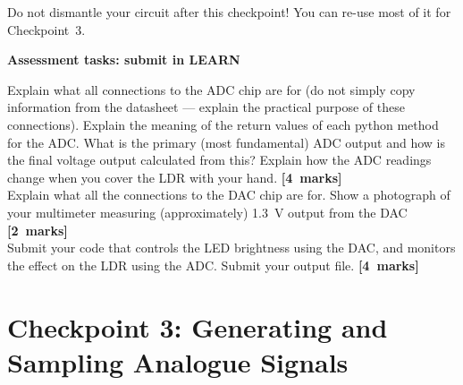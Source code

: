 Do not dismantle your circuit after this checkpoint!
You can re-use most of it for Checkpoint~3.

{\bf Assessment tasks: submit in LEARN}

Explain what all connections to the ADC chip are for (do not simply copy information from the datasheet --- explain the practical purpose of these connections).
Explain the meaning of the return values of each python method for the ADC.
What is the primary (most fundamental) ADC output and how is the final voltage output calculated from this?
Explain how the ADC readings change when you cover the LDR with your hand.
\hfill {\bf[4~marks]} \\

Explain what all the connections to the DAC chip are for.
Show a photograph of your multimeter measuring (approximately) 1.3~V output from the DAC
\hfill {\bf[2~marks]} \\

Submit your code that controls the LED brightness using the DAC, and monitors the effect on the LDR using the ADC.
Submit your output file.
\hfill {\bf[4~marks]} \\

\newpage
\section{Checkpoint 3:  Generating and Sampling Analogue Signals}

